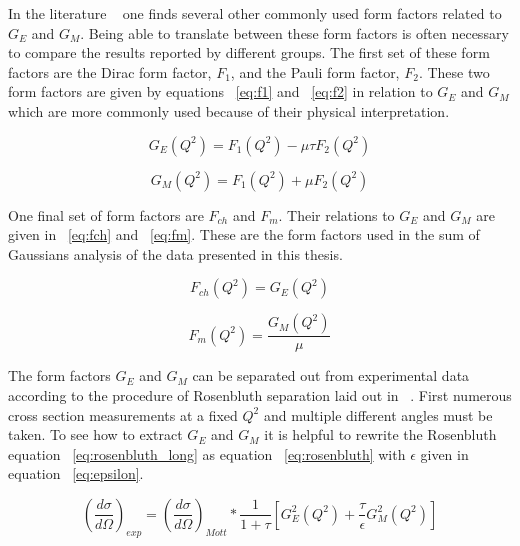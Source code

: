 In the literature ~\cite{Article:Hand} one finds several other commonly used form factors related to $G_E$ and $G_M$. Being able to translate between these form factors is often necessary to compare the results reported by different groups. The first set of these form factors are the Dirac form factor, $F_1$, and the Pauli form factor, $F_2$. These two form factors are given by equations ~\ref{eq:f1} and ~\ref{eq:f2} in relation to $G_E$ and $G_M$ which are more commonly used because of their physical interpretation.

\begin{equation} \label{eq:f1}
	G_E \left(Q^2\right) = F_1\left(Q^2\right) -\mu \tau F_2\left(Q^2\right)
\end{equation}

\begin{equation} \label{eq:f2}
	G_M \left(Q^2\right) = F_1\left(Q^2\right) + \mu F_2\left(Q^2\right)
\end{equation}

\noindent One final set of form factors are $F_{ch}$ and $F_m$. Their relations to $G_E$ and $G_M$ are given in ~\ref{eq:fch} and ~\ref{eq:fm}. These are the form factors used in the sum of Gaussians analysis of the data presented in this thesis.

\begin{equation} \label{eq:fch}
	F_{ch}\left(Q^2\right) = G_E \left(Q^2\right) 
\end{equation}

\begin{equation} \label{eq:fm}
	F_{m}\left(Q^2\right) = \frac{G_M \left(Q^2\right)}{\mu} 
\end{equation}

The form factors $G_E$ and $G_M$ can be separated out from experimental data according to the procedure of Rosenbluth separation laid out in ~\cite{Article:Hand}. First numerous cross section measurements at a fixed $Q^2$ and multiple different angles must be taken. To see how to extract $G_E$ and $G_M$ it is helpful to rewrite the Rosenbluth equation ~\ref{eq:rosenbluth_long} as equation ~\ref{eq:rosenbluth} with $\epsilon$ given in equation ~\ref{eq:epsilon}.

\begin{equation} \label{eq:rosenbluth}
\left(\frac{d\sigma}{d\Omega}\right)_{exp} = \left( \frac{d\sigma}{d\Omega} \right)_{Mott} * \frac{1}{1+\tau}\left[ G_E^2\left(Q^2\right) + \frac{\tau}{\epsilon} G_M^2\left(Q^2\right) \right]
\end{equation}

